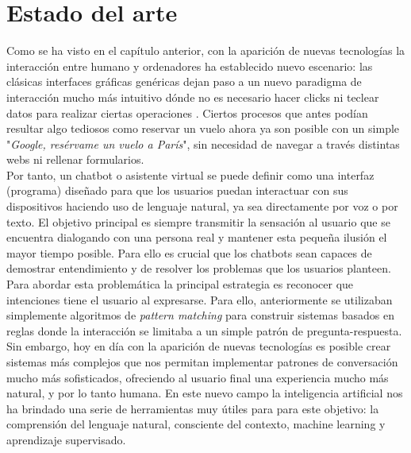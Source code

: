 \section{Estado del arte}


Como se ha visto en el capítulo anterior, con la aparición de nuevas tecnologías la interacción entre humano y ordenadores ha establecido nuevo escenario: las clásicas interfaces gráficas genéricas dejan paso a un nuevo paradigma de interacción mucho más intuitivo dónde no es necesario hacer clicks ni teclear datos para realizar ciertas operaciones \cite{conversationSystems}. Ciertos procesos que antes podían resultar algo tediosos como reservar un vuelo ahora ya son posible con un simple "\textit{Google, resérvame un vuelo a París}", sin necesidad de navegar a través distintas webs ni rellenar formularios.\\

Por tanto, un chatbot o asistente virtual se puede definir como una interfaz (programa) diseñado para que los usuarios puedan interactuar con sus dispositivos haciendo uso de lenguaje natural, ya sea directamente por voz o por texto. El objetivo principal es siempre transmitir la sensación al usuario que se encuentra dialogando con una persona real y mantener esta pequeña ilusión el mayor tiempo posible. Para ello es crucial que los chatbots sean capaces de demostrar entendimiento y de resolver los problemas que los usuarios planteen.\\


Para abordar esta problemática la principal estrategia es reconocer que intenciones tiene el usuario al expresarse. Para ello, anteriormente se utilizaban simplemente algoritmos de \textit{pattern matching} para construir sistemas basados en reglas donde la interacción se limitaba a un simple patrón de pregunta-respuesta. Sin embargo, hoy en día con la aparición de nuevas tecnologías es posible crear sistemas más complejos que nos permitan implementar patrones de conversación mucho más sofisticados, ofreciendo al usuario final una experiencia mucho más natural, y por lo tanto humana. En este nuevo campo la inteligencia artificial nos ha brindado una serie de herramientas muy útiles para para este objetivo: la comprensión del lenguaje natural, consciente del contexto, machine learning y  aprendizaje supervisado. \\

